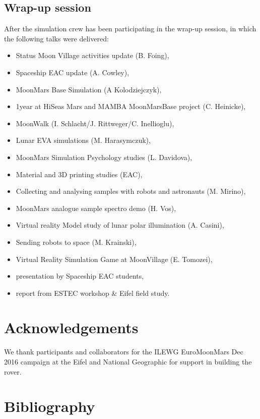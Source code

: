 \documentclass[preprint]{elsarticle}
\begin{document}
\subsection{Wrap-up session}
After the simulation crew has been participating in the wrap-up session, in which the following talks were delivered:
\begin{itemize}
\item Status Moon Village activities update (B. Foing),
\item Spaceship EAC update (A. Cowley),
\item MoonMars Base Simulation (A Kolodziejczyk),
\item 1year at HiSeas Mars and MAMBA MoonMarsBase project (C. Heinicke),
\item MoonWalk (I. Schlacht/J. Rittweger/C. Inellioglu),
\item Lunar EVA simulations (M. Harasymczuk),
\item MoonMars Simulation Psychology studies (L. Davidova),
\item Material and 3D printing studies (EAC),
\item Collecting and analysing samples with robots and astronauts (M. Mirino),
\item MoonMars analogue sample spectro demo (H. Vos),
\item Virtual reality Model study of lunar polar illumination (A. Casini),
\item Sending robots to space (M. Krainski),
\item Virtual Reality Simulation Game at MoonVillage (E. Tomozei),
\item presentation by Spaceship EAC students,
\item report from ESTEC workshop & Eifel field study.
\end{itemize}

\section{Acknowledgements}
We thank participants and collaborators for the ILEWG EuroMoonMars Dec 2016 campaign at the Eifel and National Geographic for support in building the rover.

\section{Bibliography}


\end{document}
